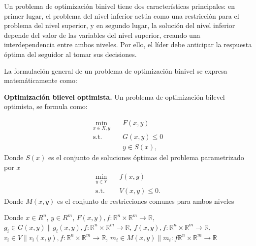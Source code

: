 Un problema de optimización binivel tiene dos características principales: en primer lugar, el problema del nivel inferior actúa como una restricción para el problema del nivel superior, y en segundo lugar, la solución del nivel inferior depende del valor de las variables del nivel superior, creando una interdependencia entre ambos niveles. Por ello, el líder debe anticipar la respuesta óptima del seguidor al tomar sus decisiones.

La formulación general de un problema de optimización binivel se expresa matemáticamente como:  



\textbf{Optimización bilevel optimista.} Un problema de optimización bilevel optimista, se formula como:

\begin{align}
    \min_{x \in X, y} & \quad F(x, y) \tag{1} \\
    \text{s.t.} & \quad G(x, y) \leq 0 \tag{2} \\
    & \quad y \in S(x), \tag{3}
\end{align}
Donde $S(x)$ es el conjunto de soluciones óptimas del problema parametrizado por $x$
\begin{align}
    \min_{y \in Y} & \quad f(x, y) \tag{4} \\
    \text{s.t.} & \quad V(x, y) \leq 0. \tag{5}
\end{align}
Donde $M(x,y)$ es el conjunto de restricciones comunes para ambos niveles

Donde $x \in R^{n}$, $y \in R^{m}$,  $F(x,y), f : \mathbb{R}^{n} \times \mathbb{R}^{m} \to \mathbb{R}$,  $g_i \in G(x,y)\| g_i(x,y) , f : \mathbb{R}^{n} \times \mathbb{R}^{m} \to \mathbb{R} $, 
$f(x,y), f : \mathbb{R}^{n} \times \mathbb{R}^{m} \to \mathbb{R}$,  $v_i \in V \| v_i(x,y), f : \mathbb{R}^{n} \times \mathbb{R}^{m} \to \mathbb{R}$,
$m_i \in M(x,y) \| m_i : f \mathbb{R}^{n} \times \mathbb{R}^{m} \to \mathbb{R}$

